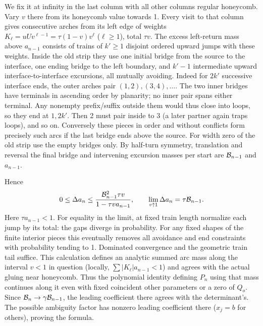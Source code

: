 We fix it at infinity in the last column with all other columns regular honeycomb. Vary \(v\) there from its honeycomb value towards 1. Every visit to that column gives consecutive arches from its left edge of weights \(K_\ell=uU v^{\ell-1}=\tau(1-v)v^\ell\) (\(\ell\ge1\)), total \(\tau v\). The excess left-return mass above \(a_{n-1}\) consists of trains of \(k'\ge1\) disjoint ordered upward jumps with these weights. Inside the old strip they use one initial bridge from the source to the interface, one ending bridge to the left boundary, and \(k'-1\) intermediate upward interface-to-interface excursions, all mutually avoiding. Indeed for \(2k'\) successive interface ends, the outer arches pair \((1,2),(3,4),\ldots\). The two inner bridges have terminals in ascending order by planarity; no inner pair spans either terminal. Any nonempty prefix/suffix outside them would thus close into loops, so they end at \(1,2k'\). Then 2 must pair inside to 3 (a later partner again traps loops), and so on. Conversely these pieces in order and without conflicts form precisely such arcs if the last bridge ends above the source. For width zero of the old strip use the empty bridges only. By half-turn symmetry, translation and reversal the final bridge and intervening excursion masses per start are \({\cal B}_{n-1}\) and \(a_{n-1}\).

Hence
\[
 0\le \Delta a_n\le
 \frac{{\cal B}_{n-1}^2\tau v}{1-\tau v a_{n-1}},
 \qquad \lim_{v\uparrow1}\Delta a_n=\tau {\cal B}_{n-1}.
\]
Here \(\tau a_{n-1}<1\). For equality in the limit, at fixed train length normalize each jump by its total: the gaps diverge in probability. For any fixed shapes of the finite interior pieces this eventually removes all avoidance and end constraints with probability tending to 1. Dominated convergence and the geometric train tail suffice. This calculation defines an analytic summed arc mass along the interval \(v<1\) in question (locally, \(\sum |K_\ell|a_{n-1}<1\)) and agrees with the actual gluing near honeycomb. Thus the polynomial identity defining \(P_n\) using that mass continues along it even with fixed coincident other parameters or a zero of \(Q_o\). Since \({\cal B}_n\to\gamma{\cal B}_{n-1}\), the leading coefficient there agrees with the determinant's. The possible ambiguity factor has nonzero leading coefficient there (\(x_j=b\) for others), proving the formula.

